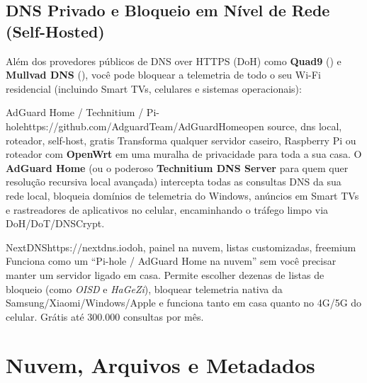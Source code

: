 \documentclass{pousadaguide}
\begin{document}
\section{DNS Privado e Bloqueio em Nível de Rede (Self-Hosted)}

Além dos provedores públicos de DNS over HTTPS (DoH) como \textbf{Quad9} () e \textbf{Mullvad DNS} (), você pode bloquear a telemetria de todo o seu Wi-Fi residencial (incluindo Smart TVs, celulares e sistemas operacionais):

\begin{ferramenta}[goat,logo=adguard]{AdGuard Home / Technitium / Pi-hole}{https://github.com/AdguardTeam/AdGuardHome}{open source, dns local, roteador, self-host, gratis}
Transforma qualquer servidor caseiro, Raspberry Pi ou roteador com \textbf{OpenWrt} em uma muralha de privacidade para toda a sua casa. O \textbf{AdGuard Home} (ou o poderoso \textbf{Technitium DNS Server} para quem quer resolução recursiva local avançada) intercepta todas as consultas DNS da sua rede local, bloqueia domínios de telemetria do Windows, anúncios em Smart TVs e rastreadores de aplicativos no celular, encaminhando o tráfego limpo via DoH/DoT/DNSCrypt. 
\end{ferramenta}

\begin{ferramenta}[recomendado,logo=nextdns]{NextDNS}{https://nextdns.io}{doh, painel na nuvem, listas customizadas, freemium}
Funciona como um ``Pi-hole / AdGuard Home na nuvem'' sem você precisar manter um servidor ligado em casa. Permite escolher dezenas de listas de bloqueio (como \emph{OISD} e \emph{HaGeZi}), bloquear telemetria nativa da Samsung/Xiaomi/Windows/Apple e funciona tanto em casa quanto no 4G/5G do celular. Grátis até 300.000 consultas por mês. 
\end{ferramenta}

\chapter{Nuvem, Arquivos e Metadados}
\end{document}
